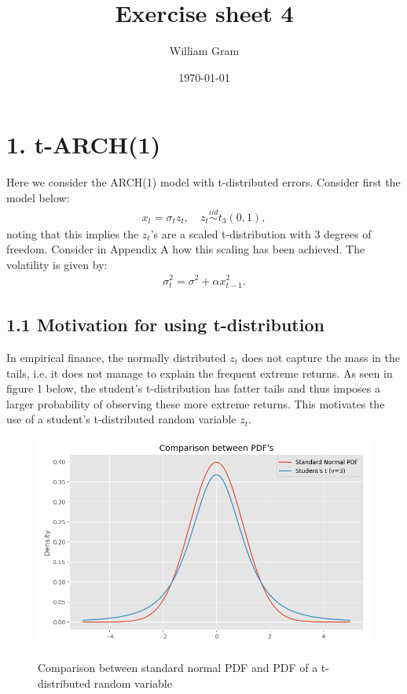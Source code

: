 \documentclass[11pt,a4paper,oneside]{article}
\title{Exercise sheet 4}
\author{William Gram}
\date{\today}
\newcommand{\lp}{\left(}
\newcommand{\rp}{\right)}
\newcommand{\iid}{\overset{iid}{\sim}}
\begin{document}
\maketitle

\rfoot{\thepage}

\section{1. t-ARCH(1)}
\renewcommand{\theequation}{1.\arabic{equation}}
\setcounter{equation}{0}

Here we consider the ARCH(1) model with t-distributed errors. Consider first the model below:
\begin{align}
    x_t = \sigma_t z_t, \quad z_t \iid t_3 \lp 0, 1\rp,
\end{align}
noting that this implies the $z_t$'s are a scaled t-distribution with 3 degrees of freedom. Consider in Appendix A how this scaling has been achieved. The volatility is given by:
\begin{align}
    \sigma_t^2 = \sigma^2 + \alpha x_{t-1}^2.
\end{align}

\subsection{1.1 Motivation for using t-distribution}
In empirical finance, the normally distributed $z_t$ does not capture the mass in the tails, i.e. it does not manage to explain the frequent extreme returns. As seen in figure 1 below, the student's t-distribution has fatter tails and thus imposes a larger probability of observing these more extreme returns. This motivates the use of a student's t-distributed random variable $z_t$.

\begin{figure}[ht]
\center
\caption{Comparison between standard normal PDF and PDF of a t-distributed random variable}
\includegraphics[scale=0.5]{images/normal_student_pdf.png}
\begingroup
{}
\endgroup
\end{figure}
\end{document}
